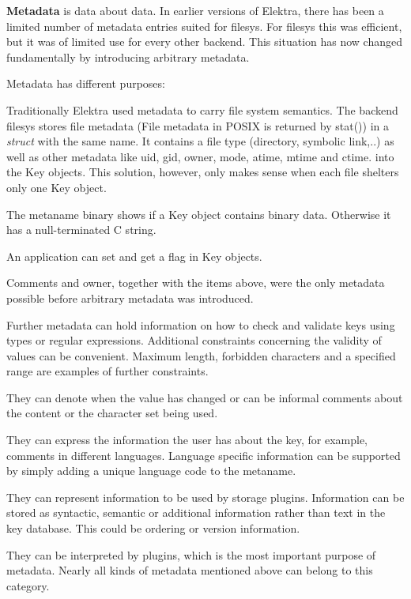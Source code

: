 {\bfseries Metadata} is data about data. In earlier versions of Elektra, there has been a limited number of metadata entries suited for {\ttfamily filesys}. For {\ttfamily filesys} this was efficient, but it was of limited use for every other backend. This situation has now changed fundamentally by introducing arbitrary metadata.

Metadata has different purposes\+:


\begin{DoxyItemize}
\item Traditionally Elektra used metadata to carry file system semantics. The backend {\ttfamily filesys} stores file metadata (File metadata in P\+O\+S\+IX is returned by {\ttfamily stat()}) in a {\itshape struct} with the same name. It contains a file type (directory, symbolic link,..) as well as other metadata like uid, gid, owner, mode, atime, mtime and ctime. into the {\ttfamily Key} objects. This solution, however, only makes sense when each file shelters only one {\ttfamily Key} object.
\item The metaname {\ttfamily binary} shows if a {\ttfamily Key} object contains binary data. Otherwise it has a null-\/terminated C string.
\item An application can set and get a flag in {\ttfamily Key} objects.
\item Comments and owner, together with the items above, were the only metadata possible before arbitrary metadata was introduced.
\item Further metadata can hold information on how to check and validate keys using types or regular expressions. Additional constraints concerning the validity of values can be convenient. Maximum length, forbidden characters and a specified range are examples of further constraints.
\item They can denote when the value has changed or can be informal comments about the content or the character set being used.
\item They can express the information the user has about the key, for example, comments in different languages. Language specific information can be supported by simply adding a unique language code to the metaname.
\item They can represent information to be used by storage plugins. Information can be stored as syntactic, semantic or additional information rather than text in the key database. This could be ordering or version information.
\item They can be interpreted by plugins, which is the most important purpose of metadata. Nearly all kinds of metadata mentioned above can belong to this category.

\end{DoxyItemize}
